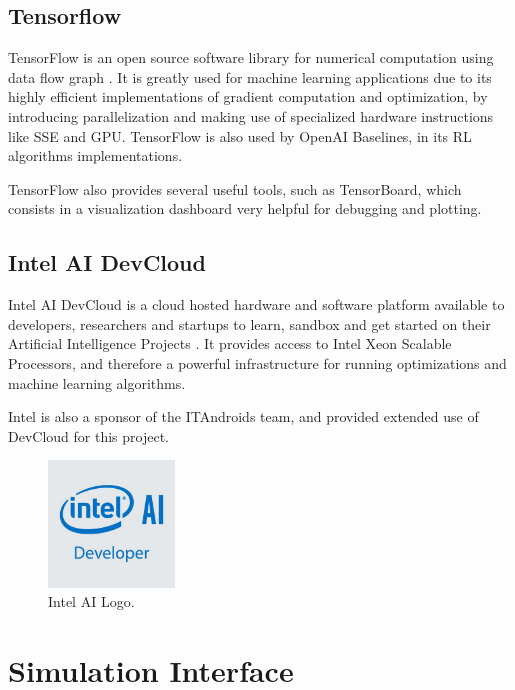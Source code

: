 \subsection{Tensorflow}

TensorFlow is an open source software library for numerical computation using data flow graph \cite{TensorFlow}. It is greatly used for machine learning applications due to its highly efficient implementations of gradient computation and optimization, by introducing parallelization and making use of specialized hardware instructions like SSE and GPU. TensorFlow is also used by OpenAI Baselines, in its RL algorithms implementations.

TensorFlow also provides several useful tools, such as TensorBoard, which consists in a visualization dashboard very helpful for debugging and plotting.

\subsection{Intel AI DevCloud}
\label{sec:devcloud}

Intel AI DevCloud is a cloud hosted hardware and software platform available to developers, researchers and startups to learn, sandbox and get started on their Artificial Intelligence Projects \cite{devcloud}. It provides access to Intel Xeon Scalable Processors, and therefore a powerful infrastructure for running optimizations and machine learning algorithms.

Intel is also a sponsor of the ITAndroids team, and provided extended use of DevCloud for this project.

\begin{figure}[H]
    \centering
    \includegraphics[width=0.3\textwidth]{Chapter5/intelai_logo.jpg} 
    \caption{Intel AI Logo.}
    \label{fig:intelai_logo}
\end{figure}

\section{Simulation Interface}

